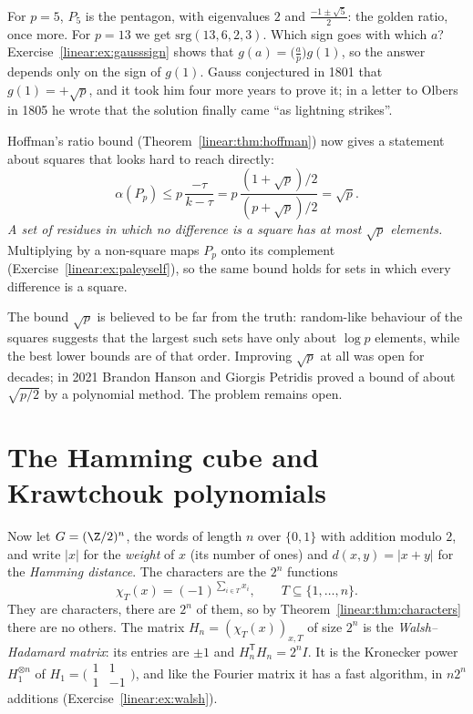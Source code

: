 For $p=5$, $P_5$ is the pentagon, with eigenvalues $2$ and $\frac{-1\pm\sqrt5}2$: the golden ratio, once more. For $p=13$ we get
$\mathrm{srg}(13,6,2,3)$. Which sign goes with which $a$? Exercise~\ref{linear:ex:gausssign} shows that $g(a)=\bigl(\frac ap\bigr)g(1)$,
so the answer depends only on the sign of $g(1)$. Gauss conjectured in 1801 that $g(1)=+\sqrt p$, and it took him four more years
to prove it; in a letter to Olbers in 1805 he wrote that the solution finally came ``as lightning strikes''.

Hoffman's ratio bound (Theorem~\ref{linear:thm:hoffman}) now gives a statement about squares that looks hard to reach directly:
\[
\alpha(P_p)\le p\,\frac{-\tau}{k-\tau}=p\,\frac{(1+\sqrt p)/2}{(p+\sqrt p)/2}=\sqrt p.
\]
\emph{A set of residues in which no difference is a square has at most $\sqrt p$ elements.} Multiplying by a non-square maps
$P_p$ onto its complement (Exercise~\ref{linear:ex:paleyself}), so the same bound holds for sets in which every difference is a square.

\begin{remark}
The bound $\sqrt p$ is believed to be far from the truth: random-like behaviour of the squares suggests that the largest such sets
have only about $\log p$ elements, while the best lower bounds are of that order. Improving $\sqrt p$ at all was open for decades;
in 2021 Brandon Hanson and Giorgis Petridis proved a bound of about $\sqrt{p/2}$ by a polynomial method. The problem remains open.
\end{remark}

\section{The Hamming cube and Krawtchouk polynomials}

Now let $G=(\Z/2)^n$, the words of length $n$ over $\{0,1\}$ with addition modulo $2$, and write $|x|$ for the \emph{weight} of $x$
(its number of ones) and $d(x,y)=|x+y|$ for the \emph{Hamming distance}. The characters are the $2^n$ functions
\[
\chi_T(x)=(-1)^{\sum_{i\in T}x_i},\qquad T\subseteq\{1,\dots,n\}.
\]
They are characters, there are $2^n$ of them, so by Theorem~\ref{linear:thm:characters} there are no others. The matrix $H_n=(\chi_T(x))
_{x,T}$ of size $2^n$ is the \emph{Walsh--Hadamard matrix}: its entries are $\pm1$ and $H_n^{\mathsf T}H_n=2^nI$. It is the
Kronecker power $H_1^{\otimes n}$ of $H_1=\bigl(\begin{smallmatrix}1&1\\1&-1\end{smallmatrix}\bigr)$, and like the Fourier matrix it
has a fast algorithm, in $n2^n$ additions (Exercise~\ref{linear:ex:walsh}).


